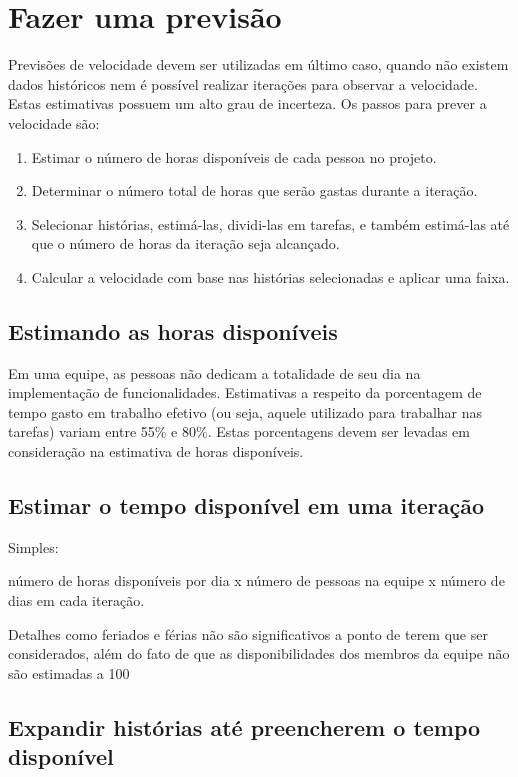 \documentclass[a4paper,abntfigtabnum,noindentfirst]{abnt}
\begin{document}
\section{Fazer uma previsão}

Previsões de velocidade devem ser utilizadas em último caso, quando não existem dados históricos nem é possível realizar iterações para observar a velocidade. Estas estimativas possuem um alto grau de incerteza. Os passos para prever a velocidade são:

\begin{enumerate}
 \item Estimar o número de horas disponíveis de cada pessoa no projeto.
 \item Determinar o número total de horas que serão gastas durante a iteração.
 \item Selecionar histórias, estimá-las, dividi-las em tarefas, e também estimá-las até que o número de horas da iteração seja alcançado.
 \item Calcular a velocidade com base nas histórias selecionadas e aplicar uma faixa.
\end{enumerate}

\subsection{Estimando as horas disponíveis}

Em uma equipe, as pessoas não dedicam a totalidade de seu dia na implementação de funcionalidades. Estimativas a respeito da porcentagem de tempo gasto em trabalho efetivo (ou seja, aquele utilizado para trabalhar nas tarefas) variam entre 55\% e 80\%. Estas porcentagens devem ser levadas em consideração na estimativa de horas disponíveis.

\subsection{Estimar o tempo disponível em uma iteração}

Simples: 

número de horas disponíveis por dia x número de pessoas na equipe x número de dias em cada iteração.

Detalhes como feriados e férias não são significativos a ponto de terem que ser considerados, além do fato de que as disponibilidades dos membros da equipe não são estimadas a 100%

\subsection{Expandir histórias até preencherem o tempo disponível}
\end{document}
